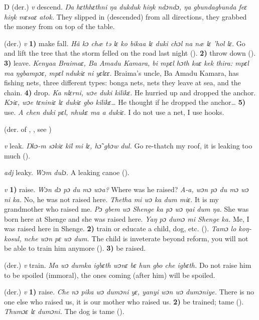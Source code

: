 \begin{letter}{D}
 (der.) \textit{v} descend. \textit{Ŋa hɛthhɛthni ŋa dukduk hiŋk ndɔndɔ, ŋa gbundagbunda feɛ hiŋk mɛsaɛ atok.} They slipped in (descended) from all directions, they grabbed the money from on top of the table.

 (der.) \textit{v} \textbf{1)} make fall. \textit{Hã kɔ chæ tə lɛ ko bikaa lɛ duki chɔl na næ lɛ 'hol lɛ.} Go and lift the tree that the storm felled on the road last night (\citealt{Pichl1967}). \textbf{2)} throw down (\citealt{Pichl1967}). \textbf{3)} leave. \textit{Kenyaa Braimaɛ, Ba Amadu Kamara, bi mpɛl hɔth kaɛ kek thira: mpɛl ma ŋgbampɔɛ, mpɛl ndukiɛ ni yɛlɛɛ.} Braima's uncle, Ba Amadu Kamara, has fishing nets, three different types: bonga nets, nets they leave at sea, and the chain. \textbf{4)} drop. \textit{Ka nlɛrni, wɔe duki kilikɛ.} He hurried up and dropped the anchor. \textit{Kɔiɛ, wɔe tɛniniɛ lɛ dukiɛ gbo kilikɛ…} He thought if he dropped the anchor… \textbf{5)} use. \textit{A chen duki pɛl, nhukɛ ma a dukiɛ.} I do not use a net, I use hooks.

 (der. of , , see ) 

 \textit{v} leak. \textit{Ŋkɔ-m sɔkiɛ kïl mi lɛ, hɔ̃ gbɔw dul.} Go re-thatch my roof, it is leaking too much (\citealt{Pichl1967}). 

 \textit{adj} leaky. \textit{Wɔm dulɔ.} A leaking canoe (\citealt{Pichl1967}). 

 \textit{v} \textbf{1)} raise. \textit{Wɔn dɔ pɔ du mɔ wɔa?} Where was he raised? \textit{A-a, wɔn pɔ du mɔ wɔ ni ka.} No, he was not raised here. \textit{Thetha mi wɔ ka dum miɛ.} It is my grandmother who raised me. \textit{Pɔ gbem wɔ Shenge ka pɔ wɔ ŋai dum ŋa.} She was born here at Shenge and she was raised here. \textit{Yaŋ pɔ dumɔ mi Shenge ka.} Me, I was raised here in Shenge. \textbf{2)} train or educate a child, dog, etc. (\citealt{Pichl1967}). \textit{Tamɔ lo koŋ-kosul, nche wɔn pɛ wɔ dum.} The child is inveterate beyond reform, you will not be able to train him anymore (\citealt{Pichl1967}). \textbf{3)} be raised.

 (der.) \textit{v} train. \textit{Ma wɔ dumka igbɛth wɔnɛ bɛ hun gbo che igbɛth.} Do not raise him to be spoiled (immoral), the ones coming (after him) will be spoiled. 

 (der.) \textit{v} \textbf{1)} raise. \textit{Che nɔ pika wɔ dumɔni yɛ, yanyi wɔn wɔ dumɔniye.} There is no one else who raised us, it is our mother who raised us. \textbf{2)} be trained; tame (\citealt{Pichl1967}). \textit{Thumɔɛ lɛ dumɔni.} The dog is tame (\citealt{Pichl1967}). 


\end{letter}
